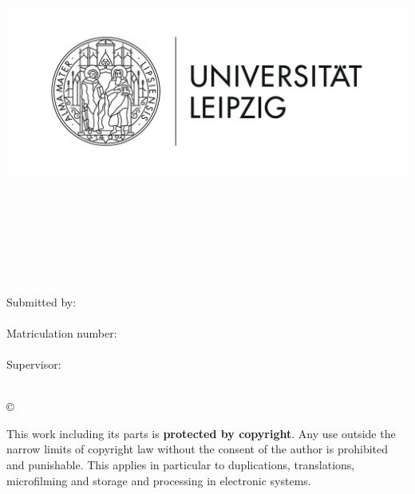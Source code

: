\thispagestyle{plain}
\begin{titlepage}

  \begin{center}
    \includegraphics[height=7cm]{Images/Uni-L.png}\\[2.5ex]

    \hochschule\\
    \institut\\
    \fakultaet\\
    \fachgebiet\\[6ex]

    \textbf{\large\titel}\\[1.5ex]
    \art\\[6ex]

    \normalsize
    Submitted by:\\
    \autor\\[1.5ex]
    Matriculation number:\\
    \matrikelnr\\[1.5ex]
    Supervisor:\\
    \erstbetreuer\\[1.0ex]
  \end{center}


  \begin{center}
    \copyright\ \jahr\\[1.0ex]
  \end{center}

  \singlespacing
  \small
  \noindent This work including its parts is \textbf{protected by copyright}. Any use outside the narrow limits of copyright law without the consent of the author is prohibited and punishable. This applies in particular to duplications, translations, microfilming and storage and processing in electronic systems.

\end{titlepage}
